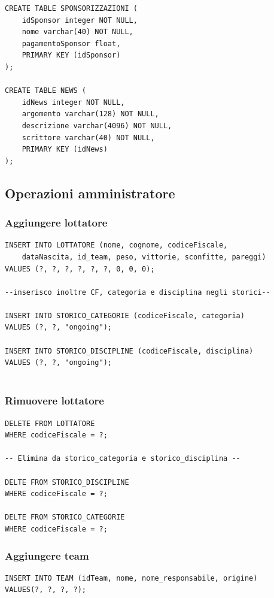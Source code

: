 \documentclass[a4paper,12pt]{report}
\begin{document}
\begin{verbatim}
CREATE TABLE SPONSORIZZAZIONI (
    idSponsor integer NOT NULL,
    nome varchar(40) NOT NULL,
    pagamentoSponsor float,
    PRIMARY KEY (idSponsor)
);

CREATE TABLE NEWS (
    idNews integer NOT NULL,
    argomento varchar(128) NOT NULL,
    descrizione varchar(4096) NOT NULL,
    scrittore varchar(40) NOT NULL,
    PRIMARY KEY (idNews)
);

\end{verbatim}
\subsection{Operazioni amministratore}
\subsubsection{Aggiungere lottatore}
\begin{verbatim}
INSERT INTO LOTTATORE (nome, cognome, codiceFiscale, 
    dataNascita, id_team, peso, vittorie, sconfitte, pareggi)
VALUES (?, ?, ?, ?, ?, ?, 0, 0, 0);

--inserisco inoltre CF, categoria e disciplina negli storici--

INSERT INTO STORICO_CATEGORIE (codiceFiscale, categoria)
VALUES (?, ?, "ongoing");

INSERT INTO STORICO_DISCIPLINE (codiceFiscale, disciplina)
VALUES (?, ?, "ongoing");


\end{verbatim}
\subsubsection{Rimuovere lottatore}
\begin{verbatim}
DELETE FROM LOTTATORE
WHERE codiceFiscale = ?;

-- Elimina da storico_categoria e storico_disciplina --

DELTE FROM STORICO_DISCIPLINE
WHERE codiceFiscale = ?;

DELTE FROM STORICO_CATEGORIE
WHERE codiceFiscale = ?;

\end{verbatim}
\subsubsection{Aggiungere team}
\begin{verbatim}
INSERT INTO TEAM (idTeam, nome, nome_responsabile, origine)
VALUES(?, ?, ?, ?);
\end{verbatim}
\end{document}
